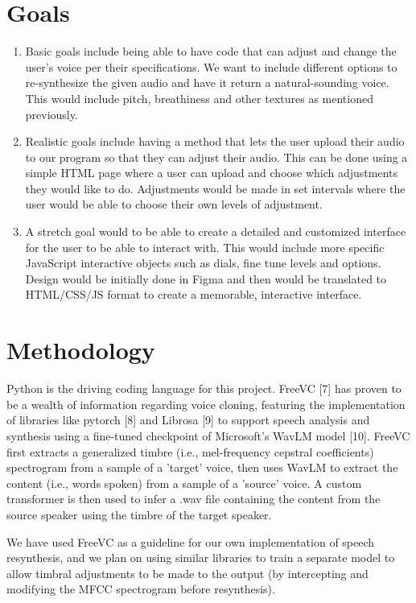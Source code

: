\documentclass{article}
\begin{document}
\section{Goals}\label{sec:page_size}
\begin{enumerate}
    \item Basic goals include being able to have code that can adjust and change the user's voice per their specifications. We want to include different options to re-synthesize the given audio and have it return a natural-sounding voice. This would include pitch, breathiness and other textures as mentioned previously.
    \item Realistic goals include having a method that lets the user upload their audio to our program so that they can adjust their audio. This can be done using a simple HTML page where a user can upload and choose which adjustments they would like to do. Adjustments would be made in set intervals where the user would be able to choose their own levels of adjustment.
    \item A stretch goal would to be able to create a detailed and customized interface for the user to be able to interact with. This would include more specific JavaScript interactive objects such as dials, fine tune levels and options. Design would be initially done in Figma and then would be translated to HTML/CSS/JS format to create a memorable, interactive interface.
\end{enumerate}

\section{Methodology}

Python is the driving coding language for this project. FreeVC [7] has proven to be a wealth of information regarding voice cloning, featuring the implementation of libraries like pytorch [8] and Librosa [9] to support speech analysis and synthesis using a fine-tuned checkpoint of Microsoft's WavLM model [10]. FreeVC first extracts a generalized timbre (i.e., mel-frequency cepstral coefficients) spectrogram from a sample of a 'target' voice, then uses WavLM to extract the content (i.e., words spoken) from a sample of a 'source' voice. A custom transformer is then used to infer a .wav file containing the content from the source speaker using the timbre of the target speaker.


We have used FreeVC as a guideline for our own implementation of speech resynthesis, and we plan on using similar libraries to train a separate model to allow timbral adjustments to be made to the output (by intercepting and modifying the MFCC spectrogram before resynthesis).
\end{document}
